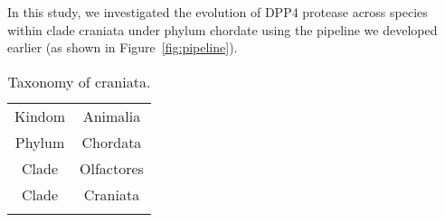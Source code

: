 In this study, we investigated the evolution of DPP4 protease across species within clade craniata under phylum chordate using the pipeline we developed earlier (as shown in Figure~\ref{fig:pipeline}). 

\begin{table} 
    \begin{tabular}{ c c }
        Kindom & Animalia \\ 
        Phylum & Chordata \\ 
        Clade & Olfactores \\ 
        Clade & Craniata \\ 
         &  \\ 
    \end{tabular} 
    \caption{Taxonomy of craniata.} 
\end{table}